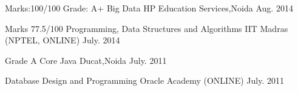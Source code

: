 \begin{cventries}
  \cventry
    {Marks:100/100 Grade: A+}
    {Big Data}
    {HP Education Services,Noida}
    {Aug. 2014}
    {
      \begin{cvitems}
        \item []
      \end{cvitems}
    }
  \cventry
    {Marks 77.5/100}
    {Programming, Data Structures and Algorithms }
    {IIT Madras (NPTEL, ONLINE)}
    {July. 2014}
    {
      \begin{cvitems}
        \item []
      \end{cvitems}
    }
  \cventry
    {Grade A}
    {Core Java}
    {Ducat,Noida}
    {July. 2011}
    {
      \begin{cvitems}
        \item []
      \end{cvitems}
    }
\cventry
    {}
    {Database Design and Programming}
    {Oracle Academy (ONLINE)}
    {July. 2011}
    {
      \begin{cvitems}
        \item []
      \end{cvitems}
    }
\end{cventries}
